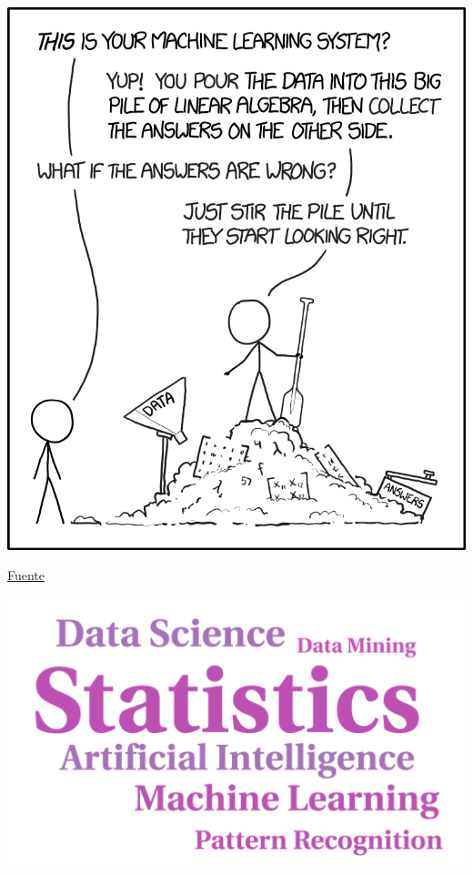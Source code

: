 \documentclass{beamer}
\begin{document}
\begin{frame}[plain]
\begin{center}
\includegraphics[height=0.85\textheight]{machine_learning_2x.png}

{\footnotesize \href{https://xkcd.com/1838/}{Fuente}}
\end{center}
\end{frame}

\begin{frame}[plain]
\includegraphics[width=\textwidth]{cloud.pdf}
\end{frame}
\end{document}

